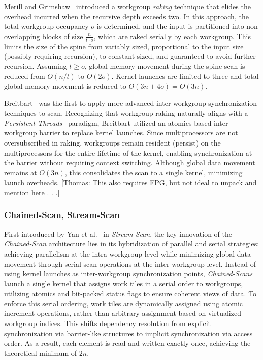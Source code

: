 \documentclass[sigconf]{acmart}
\newcommand{\thomas}[1]{{\footnotesize\color{orange}[Thomas: #1]}}
\begin{document}
Merill and Grimshaw~\cite{Merrill2009} introduced a workgroup \emph{raking} technique that elides the overhead incurred when the recursive depth exceeds two. In this approach, the total workgroup occupancy $o$ is determined, and the input is partitioned into non overlapping blocks of size $\frac{n}{t \cdot o}$, which are raked serially by each workgroup. This limits the size of the spine from variably sized, proportional to the input size (possibly requiring recursion), to constant sized, and guaranteed to avoid further recursion. Assuming $t \geq o$, global memory movement during the spine scan is reduced from $O(n/t)$ to $O(2o)$. Kernel launches are limited to three and total global memory movement is reduced to $O(3n + 4o) = O(3n)$.

Breitbart~\cite{10.5555/2031978.2032029} was the first to apply more advanced inter-workgroup synchronization techniques to scan. Recognizing that workgroup raking naturally aligns with a \emph{Persistent-Threads}~\cite{gupta2012} paradigm, Breitbart utilized an atomics-based inter-workgroup barrier to replace kernel launches. Since multiprocessors are not oversubscribed in raking, workgroups remain resident (persist) on the multiprocessors for the entire lifetime of the kernel, enabling synchronization at the barrier without requiring context switching. Although global data movement remains at $O(3n)$, this consolidates the scan to a single kernel, minimizing launch overheads. \thomas{This also requires FPG, but not ideal to unpack and mention here . . .}

\subsubsection{Chained-Scan, Stream-Scan}
First introduced by Yan et al.~\cite{10.1145/2442516.2442539} in \emph{Stream-Scan}, the key innovation of the \emph{Chained-Scan} architecture lies in its hybridization of parallel and serial strategies: achieving parallelism at the intra-workgroup level while minimizing global data movement through serial scan operations at the inter-workgroup level. Instead of using kernel launches as inter-workgroup synchronization points, \emph{Chained-Scans} launch a single kernel that assigns work tiles in a serial order to workgroups, utilizing atomics and bit-packed status flags to ensure coherent views of data. To enforce this serial ordering, work tiles are dynamically assigned using atomic increment operations, rather than arbitrary assignment based on virtualized workgroup indices. This shifts dependency resolution from explicit synchronization via barrier-like structures to implicit synchronization via access order. As a result, each element is read and written exactly once, achieving the theoretical minimum of $2n$.
\end{document}
